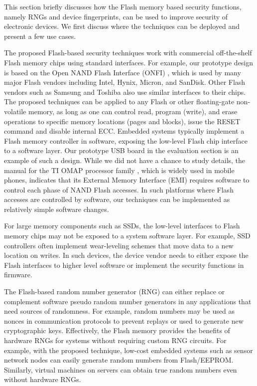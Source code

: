 This section briefly discusses how the Flash memory based security functions, namely RNGs and device fingerprints, can be used to improve security of electronic devices. We first discuss where the techniques can be deployed and present a few use cases. 

The proposed Flash-based security techniques work with commercial off-the-shelf Flash memory chips using standard interfaces. For example, our prototype design is based on the Open NAND Flash Interface (ONFI) \cite{onfi}, which is used by many major Flash vendors including Intel, Hynix, Micron, and SanDisk. Other Flash vendors such as Samsung and Toshiba also use similar interfaces to their chips. 
The proposed techniques can be applied to any Flash or other floating-gate non-volatile memory, as long as one can control read, program (write), and erase operations to specific memory locations (pages and blocks), issue the RESET command and disable internal ECC. Embedded systems typically implement a Flash memory controller in software, exposing the low-level Flash chip interface to a software layer. Our prototype USB board in the evaluation section is an example of such a design. While we did not have a chance to study details, the manual for the TI OMAP processor family \cite{instruments2013omap}, which is widely used in mobile phones, indicates that its External Memory Interface (EMI) requires software to control each phase of NAND Flash accesses. In such platforms where Flash accesses are controlled by software, our techniques can be implemented as relatively simple software changes. 

For large memory components such as SSDs, the low-level interfaces to Flash memory chips may not be exposed to a system software layer. For example, SSD controllers often implement wear-leveling schemes that move data to a new location on writes. In such devices, the device vendor needs to either expose the Flash interfaces to higher level software or implement the security functions in firmware.  


The Flash-based random number generator (RNG) can either replace or complement software pseudo random number generators in any applications that need sources of randomness. For example, random numbers may be used as nonces in communication protocols to prevent replays or used to generate new cryptographic keys. Effectively, the Flash memory provides the benefits of hardware RNGs for systems without requiring custom RNG circuits. For example, with the proposed technique, low-cost embedded systems such as sensor network nodes can easily generate random numbers from Flash/EEPROM. Similarly, virtual machines on servers can obtain true random numbers even without hardware RNGs.

